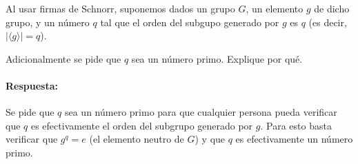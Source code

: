 %

Al usar firmas de Schnorr, suponemos dados un grupo $G$, un elemento $g$ de dicho grupo, y un número $q$ tal que el orden del subgupo generado por $g$ es $q$ (es decir, $|\langle g\rangle|=q$).

Adicionalmente se pide que $q$ sea un número primo. Explique por qué.
\paragraph{Respuesta:} Se pide que $q$ sea un número primo para que cualquier persona pueda verificar que $q$ es efectivamente el orden del subgrupo generado por $g$. Para esto basta verificar que $g^q=e$ (el elemento neutro de $G$) y que $q$ es efectivamente un número primo.

